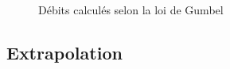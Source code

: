 \begin{figure}[H]
    \centering
    \caption{Débits calculés selon la loi de Gumbel}
    \label{graph:debits_gumbel_tronquee}
\end{figure}


\subsection{Extrapolation}
